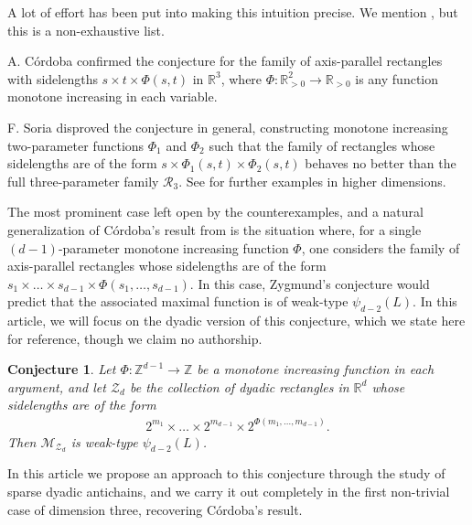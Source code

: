 \documentclass[oneside]{amsart}
\newtheorem{conjecture}{Conjecture}
\theoremstyle{definition}
\theoremstyle{plain}
\numberwithin{equation}{section}
\numberwithin{theorem}{section}
\begin{document}
A lot of effort has been put into making this intuition precise.
We mention \cite{
  Zygmund1967,
  Cordoba1979,
  Soria1986,
  FeffermanPipher2005,
  Stokolos2005,
  HS2022,
  HOS2023,
  ADMM2023,
  Gauvan2024}, but this is a non-exhaustive list.

A. Córdoba \cite{Cordoba1979} confirmed the conjecture for the family of
axis-parallel rectangles with sidelengths $s \times t \times \Phi(s,t)$ in
$\mathbb{R}^3$, where $\Phi : \mathbb{R}_{>0}^2 \to \mathbb{R}_{>0}$ is any
function monotone increasing in each variable.

F. Soria \cite{Soria1986} disproved the conjecture in general, constructing
monotone increasing two-parameter functions $\Phi_1$ and $\Phi_2$ such that the
family of rectangles whose sidelengths are of the form
$s \times \Phi_1(s,t) \times \Phi_2(s,t)$ behaves no better than the full
three-parameter family $\mathcal{R}_3$. See \cite{Rey2020} for further examples
in higher dimensions.

The most prominent case left open by the counterexamples, and a natural
generalization of Córdoba's result from \cite{Cordoba1979} is the situation
where, for a single $(d-1)$-parameter monotone increasing function $\Phi$, one
considers the family of axis-parallel rectangles whose sidelengths are of the
form
  $s_1 \times \dots \times s_{d-1} \times \Phi(s_1, \dots, s_{d-1}).$
In this case, Zygmund's conjecture would predict that the associated maximal
function is of weak-type $\psi_{d-2}(L)$.
In this article, we will focus on the dyadic version of this conjecture,
which we state here for reference, though we claim no authorship.
\begin{conjecture} \label{zygmund_conjecture}
  Let $\Phi : \mathbb{Z}^{d-1} \to \mathbb{Z}$ be a monotone increasing function
  in each argument, and let $\mathcal{Z}_d$ be the collection of dyadic
  rectangles in $\mathbb{R}^d$ whose sidelengths are of the form
  \begin{align*}
    2^{m_1} \times \dots \times 2^{m_{d-1}}
      \times 2^{\Phi(m_1, \dots, m_{d-1})}.
  \end{align*}
  Then $\mathcal{M}_{\mathcal{Z}_d}$ is weak-type $\psi_{d-2}(L)$.
\end{conjecture}

In this article we propose an approach to this conjecture through the study of
sparse dyadic antichains, and we carry it out completely in the first
non-trivial case of dimension three, recovering Córdoba's result.
\end{document}
